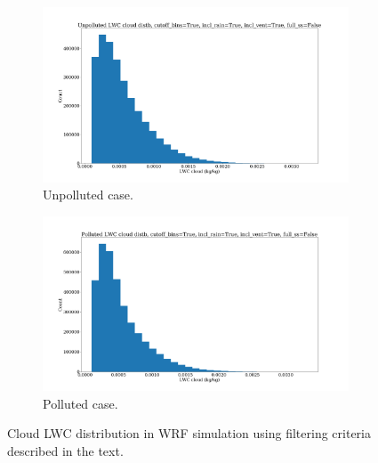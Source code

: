 \documentclass{article}
\begin{document}
\begin{figure}[ht]
	\centering
	\begin{subfigure}{0.7\textwidth}
		\includegraphics[width=\textwidth]{revmywrf/v9_lwc_hist_Unpolluted_figure.png}
		\caption{Unpolluted case.}
		\label{wrflwchistunpoll}
	\end{subfigure}
	\begin{subfigure}{0.7\textwidth}
		\includegraphics[width=\textwidth]{revmywrf/v9_lwc_hist_Polluted_figure.png}
		\caption{Polluted case.}
		\label{wrflwchistpoll}
	\end{subfigure}
	\caption{Cloud LWC distribution in WRF simulation using filtering criteria described in the text.}
	\label{wrflwchist}
\end{figure}
\end{document}
